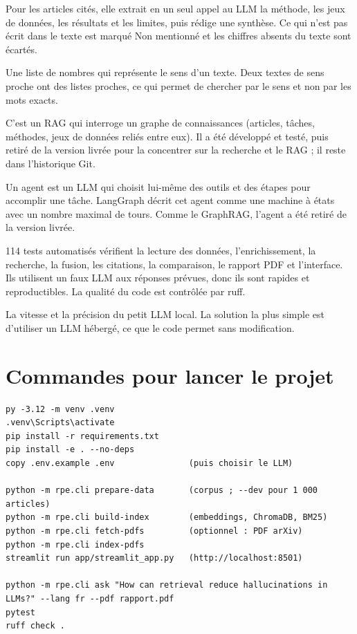 \documentclass[11pt,a4paper]{article}
\begin{document}
Pour les articles cités, elle extrait en un seul appel au LLM la méthode, les jeux de
données, les résultats et les limites, puis rédige une synthèse. Ce qui n'est pas écrit
dans le texte est marqué \og Non mentionné \fg{} et les chiffres absents du texte sont
écartés.

Une liste de nombres qui représente le sens d'un texte. Deux textes de sens proche ont des
listes proches, ce qui permet de chercher par le sens et non par les mots exacts.

C'est un RAG qui interroge un graphe de connaissances (articles, tâches, méthodes, jeux de
données reliés entre eux). Il a été développé et testé, puis retiré de la version livrée
pour la concentrer sur la recherche et le RAG ; il reste dans l'historique Git.

Un agent est un LLM qui choisit lui-même des outils et des étapes pour accomplir une tâche.
LangGraph décrit cet agent comme une machine à états avec un nombre maximal de tours. Comme
le GraphRAG, l'agent a été retiré de la version livrée.

114 tests automatisés vérifient la lecture des données, l'enrichissement, la recherche, la
fusion, les citations, la comparaison, le rapport PDF et l'interface. Ils utilisent un faux
LLM aux réponses prévues, donc ils sont rapides et reproductibles. La qualité du code est
contrôlée par ruff.

La vitesse et la précision du petit LLM local. La solution la plus simple est d'utiliser un
LLM hébergé, ce que le code permet sans modification.

\appendix
\section{Commandes pour lancer le projet}

\begin{lstlisting}
py -3.12 -m venv .venv
.venv\Scripts\activate
pip install -r requirements.txt
pip install -e . --no-deps
copy .env.example .env               (puis choisir le LLM)

python -m rpe.cli prepare-data       (corpus ; --dev pour 1 000 articles)
python -m rpe.cli build-index        (embeddings, ChromaDB, BM25)
python -m rpe.cli fetch-pdfs         (optionnel : PDF arXiv)
python -m rpe.cli index-pdfs
streamlit run app/streamlit_app.py   (http://localhost:8501)

python -m rpe.cli ask "How can retrieval reduce hallucinations in LLMs?" --lang fr --pdf rapport.pdf
pytest
ruff check .
\end{lstlisting}
\end{document}
